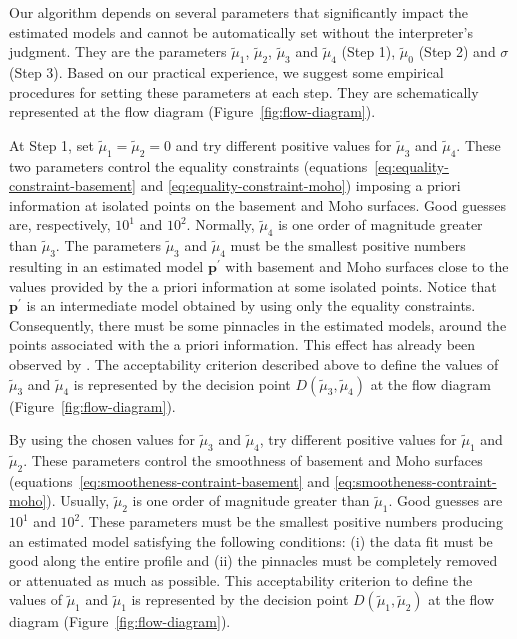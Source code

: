 \documentclass[manuscript]{geophysics}
\begin{document}
Our algorithm depends on several parameters that significantly impact the estimated models
and cannot be automatically set without the interpreter’s judgment.
They are the parameters $\tilde{\mu}_{1}$, $\tilde{\mu}_{2}$, $\tilde{\mu}_{3}$ 
and $\tilde{\mu}_{4}$ (Step 1), $\tilde{\mu}_{0}$ (Step 2) and $\sigma$ (Step 3).
Based on our practical experience, we suggest some empirical procedures for setting these
parameters at each step. They are schematically represented at the flow diagram 
(Figure~\ref{fig:flow-diagram}).

At Step 1, set $\tilde{\mu}_{1} = \tilde{\mu}_{2} = 0$ and try different positive 
values for $\tilde{\mu}_{3}$ and $\tilde{\mu}_{4}$. 
These two parameters control the equality constraints
(equations~\ref{eq:equality-constraint-basement} and \ref{eq:equality-constraint-moho})
imposing a priori information at isolated points on the basement and Moho surfaces.
Good guesses are, respectively,
$10^{1}$ and $10^{2}$. Normally, $\tilde{\mu}_{4}$ is one order of magnitude greater
than $\tilde{\mu}_{3}$. 
The parameters $\tilde{\mu}_{3}$ and $\tilde{\mu}_{4}$ 
must be the smallest positive numbers resulting in an estimated model $\mathbf{p}^{\prime}$ 
with basement and Moho surfaces close to the values provided by the a priori information
at some isolated points. Notice that $\mathbf{p}^{\prime}$ is an intermediate model 
obtained by using only the equality constraints. Consequently, there must be some
pinnacles in the estimated models, around the points associated with the a priori 
information. This effect has already been observed by \citet{barbosa-etal1997}.
The acceptability criterion described above to define the values of $\tilde{\mu}_{3}$ and 
$\tilde{\mu}_{4}$ is represented by the decision point $D(\tilde{\mu}_{3}, \tilde{\mu}_{4})$ 
at the flow diagram (Figure~\ref{fig:flow-diagram}).

By using the chosen values for $\tilde{\mu}_{3}$ and $\tilde{\mu}_{4}$, 
try different positive values for $\tilde{\mu}_{1}$ and $\tilde{\mu}_{2}$.
These parameters control the smoothness of basement and Moho surfaces
(equations~\ref{eq:smootheness-contraint-basement} and \ref{eq:smootheness-contraint-moho}).
Usually, $\tilde{\mu}_{2}$ is one order of magnitude greater than $\tilde{\mu}_{1}$.
Good guesses are $10^{1}$ and $10^{2}$.
These parameters must be the smallest positive numbers producing an estimated model
satisfying the following conditions: (i) the data fit must be good along the entire profile
and (ii) the pinnacles must be completely removed or attenuated as much as possible.
This acceptability criterion to define the values of $\tilde{\mu}_{1}$ and 
$\tilde{\mu}_{1}$ is represented by the decision point $D(\tilde{\mu}_{1}, \tilde{\mu}_{2})$ 
at the flow diagram (Figure~\ref{fig:flow-diagram}).
\end{document}
